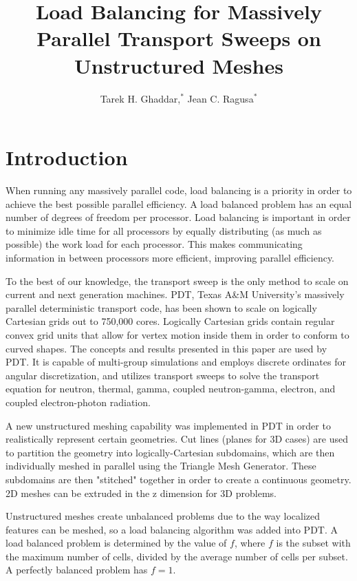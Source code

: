 \documentclass{anstrans}
\title{Load Balancing for Massively Parallel Transport Sweeps on Unstructured Meshes }
\author{Tarek H. Ghaddar,$^{*}$ Jean C. Ragusa$^{*}$}
\institute{
$^{*}$Dept. of Nuclear Engineering, Texas A\&M University, College Station, TX, 77843-3133
\and

}
\begin{document}
\section{Introduction}
\label{ch:introduction}
When running any massively parallel code, load balancing is a priority in order to achieve the best possible parallel efficiency. A load balanced problem has an equal number of degrees of freedom per processor. Load balancing is important in order to minimize idle time for all processors by equally distributing (as much as possible) the work load for each processor. This makes communicating information in between processors more efficient, improving parallel efficiency. 

To the best of our knowledge, the transport sweep is the only method to scale on current and next generation machines. PDT, Texas A\&M University's massively parallel deterministic transport code, has been shown to scale on logically Cartesian grids out to 750,000 cores\cite{mpadams2015}. Logically Cartesian grids contain regular convex grid units that allow for vertex motion inside them in order to conform to curved shapes. The concepts and results presented in this paper are used by PDT. It is capable of multi-group simulations and employs discrete ordinates for angular discretization, and utilizes transport sweeps to solve the transport equation for neutron, thermal, gamma, coupled neutron-gamma, electron, and coupled electron-photon radiation.

A new unstructured meshing capability was implemented in PDT in order to realistically represent certain geometries. Cut lines (planes for 3D cases) are used to partition the geometry into logically-Cartesian subdomains, which are then individually meshed in parallel using the Triangle Mesh Generator\cite{triangle}. These subdomains are then "stitched" together in order to create a continuous geometry. 2D meshes can be extruded in the z dimension for 3D problems. 

Unstructured meshes create unbalanced problems due to the way localized features can be meshed, so a load balancing algorithm was added into PDT. A load balanced problem is determined by the value of $f$, where $f$ is the subset with the maximum number of cells, divided by the average number of cells per subset. A perfectly balanced problem has $f = 1$.


\end{document}
